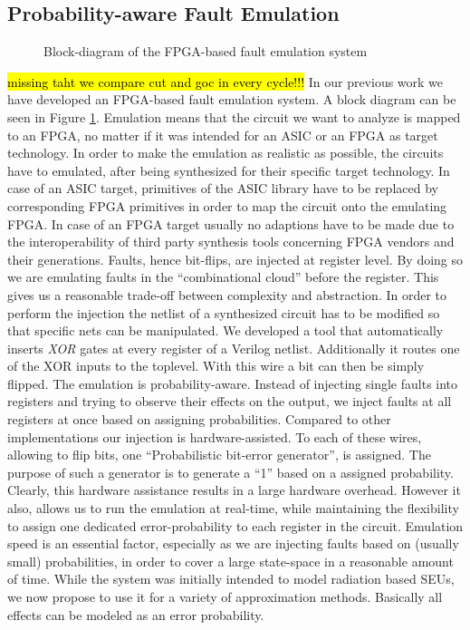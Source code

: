 \documentclass[conference]{IEEEtran}
\begin{document}
\subsection{Probability-aware Fault Emulation}
\begin{figure}[htb]
  \centering
  \caption{Block-diagram of the FPGA-based fault emulation system}
  \label{fig:faultify_block}
\end{figure}
\hl{missing taht we compare cut and goc in every cycle!!!}
In our previous work we have developed an FPGA-based fault emulation system. A block diagram can be seen in Figure \ref{fig:faultify_block}. Emulation means that the circuit we want to analyze is mapped to an FPGA, no matter if it was intended for an ASIC or an FPGA as target technology. In order to make the emulation as realistic as possible, the circuits have to emulated, after being synthesized for their specific target technology. In case of an ASIC target, primitives of the ASIC library have to be replaced by corresponding FPGA primitives in order to map the circuit onto the emulating FPGA. In case of an FPGA target usually no adaptions have to be made due to the interoperability of third party synthesis tools concerning FPGA vendors and their generations. Faults, hence bit-flips, are injected at register level. By doing so we are emulating faults in the ``combinational cloud'' before the register. This gives us a reasonable trade-off between complexity and abstraction. In order to perform the injection the netlist of a synthesized circuit has to be modified so that specific nets can be manipulated. We developed a tool that automatically inserts \emph{XOR} gates at every register of a Verilog netlist. Additionally it routes one of the XOR inputs to the toplevel. With this wire a bit can then be simply flipped. The emulation is probability-aware. Instead of injecting single faults into registers and trying to observe their effects on the output, we inject faults at all registers at once based on assigning probabilities. Compared to other implementations our injection is hardware-assisted. To each of these wires, allowing to flip bits, one ``Probabilistic bit-error generator'', is assigned. The purpose of such a generator is to generate a ``1'' based on a assigned probability. Clearly, this hardware assistance results in a large hardware overhead. However it also, allows us to run the emulation at real-time, while maintaining the flexibility to assign one dedicated error-probability to each register in the circuit. Emulation speed is an essential factor, especially as we are injecting faults based on (usually small) probabilities, in order to cover a large state-space in a reasonable amount of time. While the system was initially intended to model radiation based SEUs, we now propose to use it for a variety of approximation methods. Basically all effects can be modeled as an error probability. 
\end{document}
